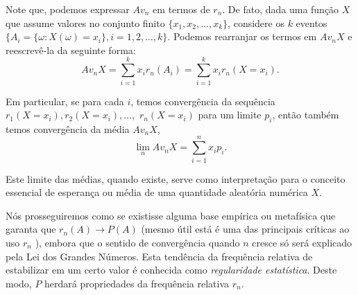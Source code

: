 \begin{frame}
%
%
Note que, podemos  expressar $Av_n$ em termos de $r_n$.  De fato, dada uma função $X$ que
assume valores no conjunto finito $\{x_1,x_2,\ldots,x_k\}$,
considere os $k$ eventos
$\{A_i=\{\omega:X(\omega)=x_i\},i=1,2,\ldots,k\}$. Podemos
rearranjar os termos em $Av_nX$ e reescrevê-la da seguinte forma:
$$Av_nX=\sum_{i=1}^{k}x_ir_n(A_i)=\sum_{i=1}^{k}x_ir_n(X=x_i).$$

Em particular, se para cada $i$, temos convergência da sequência
$r_1(X=x_i),r_2(X=x_i),\ldots,$ $r_n(X=x_i)$ para um limite $p_i$,
então também temos convergência da média $Av_n X$,
$$\lim_n Av_nX=\sum_{i=1}^{n}x_ip_i.$$

Este limite das médias, quando existe, serve como interpretação para
o conceito essencial de esperança ou média de uma quantidade
aleatória numérica $X$.
%

\begin{block}{}


Nós prosseguiremos como se existisse alguma base empírica ou
metafísica que garanta que $r_n(A)\rightarrow P(A)$ (mesmo útil está é uma das principais críticas ao uso $r_n$ ), embora que o
sentido de convergência quando $n$ cresce só será explicado pela Lei
dos Grandes Números. Esta
tendência da frequência relativa de estabilizar em um certo valor é
conhecida como {\em regularidade estatística}. Deste modo, $P$
herdará propriedades da frequência relativa $r_n$.

\end{block}

\end{frame}
%
%
%
%
%
